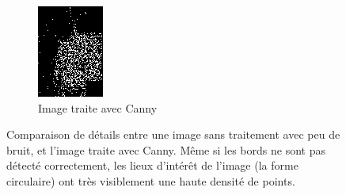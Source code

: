 \documentclass[a4paper, 12pt, titlepage, oneside, french]{article}
\begin{document}
\begin{figure}[H]
		\begin{subfigure}[]{0.4\linewidth}
			\includegraphics[width=\linewidth]{CANNY_ExempleDetailsB.png}
			\caption{Image traite avec Canny}
		\end{subfigure}
		\caption{Comparaison de détails entre une image sans traitement avec peu de bruit, et l'image traite avec Canny. Même si les bords ne sont pas détecté correctement, les lieux d'intérêt de l'image (la forme circulaire) ont très visiblement une haute densité de points.}
		\label{fig:CannyDetails}
	\end{figure}
\end{document}
